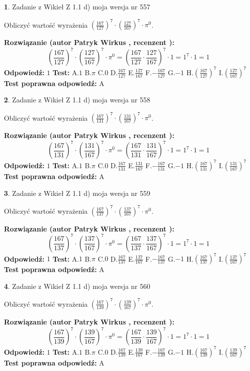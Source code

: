 \documentclass[12pt, a4paper]{article}
\theoremstyle{definition} %
\newtheorem{zad}{}
\newcommand{\zadStart}[1]{\begin{zad}#1\newline}
\newcommand{\zadStop}{\end{zad}}
\newcommand{\rozwStart}[2]{\noindent \textbf{Rozwiązanie (autor #1 , recenzent #2): }\newline}
\newcommand{\rozwStop}{\newline}
\newcommand{\odpStart}{\noindent \textbf{Odpowiedź:}\newline}
\newcommand{\odpStop}{\newline}
\newcommand{\testStart}{\noindent \textbf{Test:}\newline}
\newcommand{\testStop}{\newline}
\newcommand{\kluczStart}{\noindent \textbf{Test poprawna odpowiedź:}\newline}
\newcommand{\kluczStop}{\newline}
\begin{document}
\zadStart{Zadanie z Wikieł Z 1.1 d) moja wersja nr 557}

Obliczyć wartość wyrażenia $(\frac{167}{127})^{7} \cdot (\frac{127}{167})^{7} \cdot \pi^{0}$.
\zadStop
\rozwStart{Patryk Wirkus}{}
$$(\frac{167}{127})^{7} \cdot (\frac{127}{167})^{7} \cdot \pi^{0} = (\frac{167}{127} \cdot \frac{127}{167})^{7} \cdot 1 = 1^{7} \cdot 1 = 1$$
\rozwStop
\odpStart
$1$
\odpStop
\testStart
A.$1$ B.$\pi$ C.$0$ D.$\frac{167}{127}$ E.$\frac{127}{167}$
F.$-\frac{167}{127}$ G.$-1$
H.$(\frac{167}{127})^{7}$
I.$(\frac{127}{167})^{7}$
\testStop
\kluczStart
A
\kluczStop



\zadStart{Zadanie z Wikieł Z 1.1 d) moja wersja nr 558}

Obliczyć wartość wyrażenia $(\frac{167}{131})^{7} \cdot (\frac{131}{167})^{7} \cdot \pi^{0}$.
\zadStop
\rozwStart{Patryk Wirkus}{}
$$(\frac{167}{131})^{7} \cdot (\frac{131}{167})^{7} \cdot \pi^{0} = (\frac{167}{131} \cdot \frac{131}{167})^{7} \cdot 1 = 1^{7} \cdot 1 = 1$$
\rozwStop
\odpStart
$1$
\odpStop
\testStart
A.$1$ B.$\pi$ C.$0$ D.$\frac{167}{131}$ E.$\frac{131}{167}$
F.$-\frac{167}{131}$ G.$-1$
H.$(\frac{167}{131})^{7}$
I.$(\frac{131}{167})^{7}$
\testStop
\kluczStart
A
\kluczStop



\zadStart{Zadanie z Wikieł Z 1.1 d) moja wersja nr 559}

Obliczyć wartość wyrażenia $(\frac{167}{137})^{7} \cdot (\frac{137}{167})^{7} \cdot \pi^{0}$.
\zadStop
\rozwStart{Patryk Wirkus}{}
$$(\frac{167}{137})^{7} \cdot (\frac{137}{167})^{7} \cdot \pi^{0} = (\frac{167}{137} \cdot \frac{137}{167})^{7} \cdot 1 = 1^{7} \cdot 1 = 1$$
\rozwStop
\odpStart
$1$
\odpStop
\testStart
A.$1$ B.$\pi$ C.$0$ D.$\frac{167}{137}$ E.$\frac{137}{167}$
F.$-\frac{167}{137}$ G.$-1$
H.$(\frac{167}{137})^{7}$
I.$(\frac{137}{167})^{7}$
\testStop
\kluczStart
A
\kluczStop



\zadStart{Zadanie z Wikieł Z 1.1 d) moja wersja nr 560}

Obliczyć wartość wyrażenia $(\frac{167}{139})^{7} \cdot (\frac{139}{167})^{7} \cdot \pi^{0}$.
\zadStop
\rozwStart{Patryk Wirkus}{}
$$(\frac{167}{139})^{7} \cdot (\frac{139}{167})^{7} \cdot \pi^{0} = (\frac{167}{139} \cdot \frac{139}{167})^{7} \cdot 1 = 1^{7} \cdot 1 = 1$$
\rozwStop
\odpStart
$1$
\odpStop
\testStart
A.$1$ B.$\pi$ C.$0$ D.$\frac{167}{139}$ E.$\frac{139}{167}$
F.$-\frac{167}{139}$ G.$-1$
H.$(\frac{167}{139})^{7}$
I.$(\frac{139}{167})^{7}$
\testStop
\kluczStart
A
\kluczStop
\end{document}
